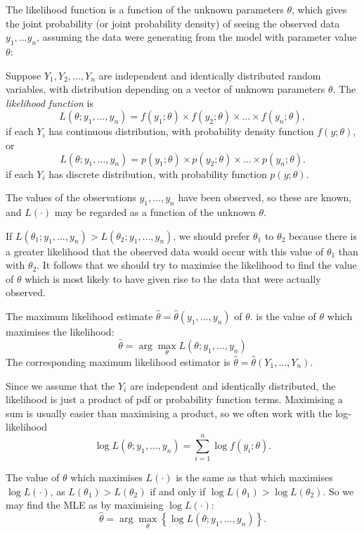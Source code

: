 \documentclass[]{book}
\theoremstyle{definition}
\theoremstyle{definition}
\theoremstyle{definition}
\theoremstyle{remark}
\let\BeginKnitrBlock\begin \let\EndKnitrBlock\end
\begin{document}
The likelihood function is a function of the unknown parameters
\(\theta\), which gives the joint probability (or joint probability
density) of seeing the observed data \(y_1, \ldots y_n\), assuming the
data were generating from the model with parameter value \(\theta\):
\BeginKnitrBlock{definition}
\protect\hypertarget{def:unnamed-chunk-97}{}{\label{def:unnamed-chunk-97}
}Suppose \(Y_1, Y_2, \ldots, Y_n\) are independent and identically
distributed random variables, with distribution depending on a vector of
unknown parameters \(\theta\). The \emph{likelihood function} is
\[L(\theta; y_1, \ldots, y_n) = f(y_1 ; \theta) \times f(y_2 ; \theta) \times \ldots \times  f(y_n ; \theta),\]
if each \(Y_i\) has continuous distribution, with probability density
function \(f(y; \theta)\), or
\[L(\theta; y_1, \ldots, y_n) = p(y_1 ; \theta) \times p(y_2 ; \theta) \times \ldots \times p(y_n ; \theta).\]
if each \(Y_i\) has discrete distribution, with probability function
\(p(y; \theta)\).
\EndKnitrBlock{definition}

The values of the observations \(y_1, \ldots, y_n\) have been observed,
so these are known, and \(L(\cdot)\) may be regarded as a function of
the unknown \(\theta\).

If
\(L(\theta_1 ; y_1 , \ldots, y_n) > L(\theta_2 ; y_1 , \ldots, y_n )\),
we should prefer \(\theta_1\) to \(\theta_2\) because there is a greater
likelihood that the observed data would occur with this value of
\(\theta_1\) than with \(\theta_2\). It follows that we should try to
maximise the likelihood to find the value of \(\theta\) which is most
likely to have given rise to the data that were actually observed.

The maximum likelihood estimate
\(\hat \theta = \hat \theta(y_1, \ldots, y_n)\) of \(\theta\). is the
value of \(\theta\) which maximises the likelihood:
\[\hat \theta = \arg \max_{\theta}L(\theta; y_1, \ldots, y_n)\] The
corresponding maximum likelihood estimator is
\(\hat \theta = \hat \theta(Y_1, \ldots, Y_n)\).

Since we assume that the \(Y_i\) are independent and identically
distributed, the likelihood is just a product of pdf or probability
function terms. Maximising a sum is usually easier than maximising a
product, so we often work with the log-likelihood
\[\log L(\theta; y_1, \ldots, y_n) = 
  \sum_{i=1}^n \log f(y_i; \theta).\]

The value of \(\theta\) which maximises \(L(\cdot)\) is the same as that
which maximises \(\log L(\cdot)\), as \(L(\theta_1 ) > L(\theta_2)\) if
and only if \(\log L(\theta_1) > \log L(\theta_2)\). So we may find the
MLE as by maximising \(\log L(\cdot)\):
\[\hat \theta = \arg \max_{\theta}\left\{\log L(\theta; y_1, \ldots, y_n)\right\}.\]
\end{document}

